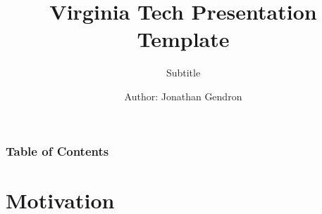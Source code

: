 \documentclass[
    11pt, %
    aspectratio=169, %
]{beamer}
\title[Middle Footer]{Virginia Tech Presentation Template}
\subtitle{Subtitle}
\author[Left Footer]{Author: Jonathan Gendron}
\institute[]{Department of Economics \\ \smallskip \textit{email@vt.edu}}
\date[Fall 20XX]
\begin{document}
\section{}
\begin{frame}
	\titlepage %
 
\end{frame}


\begin{frame}
	\frametitle{Table of Contents} %
	
	\tableofcontents %
\end{frame}

\section{Motivation} %
\end{document}
